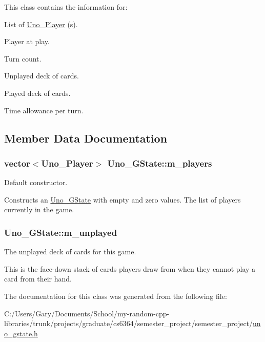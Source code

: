 \-This class contains the information for\-: \begin{DoxyItemize}
\item \-List of \hyperlink{class_uno___player}{\-Uno\-\_\-\-Player} (s). \item \-Player at play. \item \-Turn count. \item \-Unplayed deck of cards. \item \-Played deck of cards. \item \-Time allowance per turn. \end{DoxyItemize}


\subsection{\-Member \-Data \-Documentation}
\hypertarget{class_uno___g_state_acf0593a856c85059d8bd6bc71ee3165c}{
\subsubsection[{m\-\_\-players}]{\setlength{\rightskip}{0pt plus 5cm}vector$<${\bf \-Uno\-\_\-\-Player}$>$ {\bf \-Uno\-\_\-\-G\-State\-::m\-\_\-players}}}
\label{class_uno___g_state_acf0593a856c85059d8bd6bc71ee3165c}


\-Default constructor. 

\-Constructs an \hyperlink{class_uno___g_state}{\-Uno\-\_\-\-G\-State} with empty and zero values. \-The list of players currently in the game. \hypertarget{class_uno___g_state_afcc8256ce8ae779aa3e529f33a8818c1}{
\subsubsection[{m\-\_\-unplayed}]{ {\bf \-Uno\-\_\-\-G\-State\-::m\-\_\-unplayed}}}
\label{class_uno___g_state_afcc8256ce8ae779aa3e529f33a8818c1}


\-The unplayed deck of cards for this game. 

\-This is the face-\/down stack of cards players draw from when they cannot play a card from their hand. 

\-The documentation for this class was generated from the following file\-:\begin{DoxyCompactItemize}
\item 
\-C\-:/\-Users/\-Gary/\-Documents/\-School/my-\/random-\/cpp-\/libraries/trunk/projects/graduate/cs6364/semester\-\_\-project/semester\-\_\-project/\hyperlink{uno__gstate_8h}{uno\-\_\-gstate.\-h}\end{DoxyCompactItemize}
